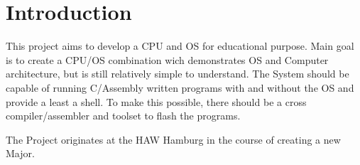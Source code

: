 
\chapter{Introduction}

This project aims to develop a CPU and OS for educational purpose.
Main goal is to create a CPU/OS combination wich  demonstrates OS and Computer architecture,
but is still relatively simple to understand. 
The System should be capable of running C/Assembly written programs with and without the OS
and provide a least a shell. 
To make this possible, there should be a cross compiler/assembler and  toolset to flash the programs.

The Project originates at the HAW Hamburg in the course of creating a new Major.

